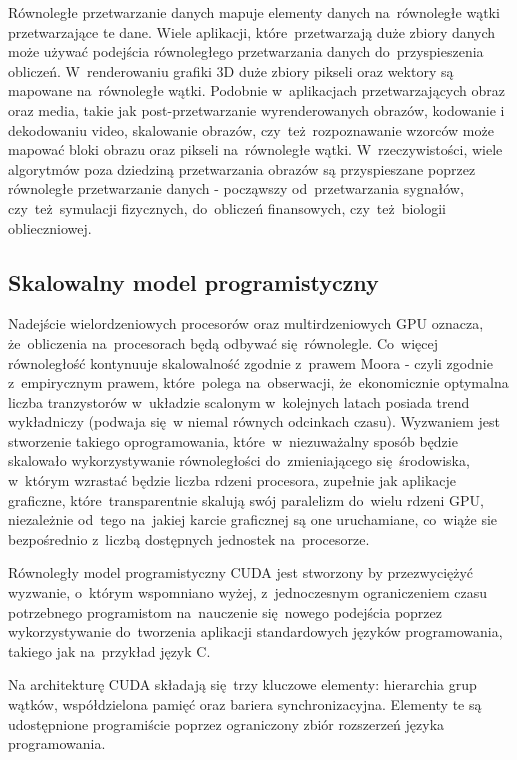 Równoległe przetwarzanie danych mapuje elementy danych na~równoległe wątki przetwarzające te dane. Wiele aplikacji, które~przetwarzają duże zbiory danych może używać podejścia równoległego przetwarzania danych do~przyspieszenia obliczeń. W~renderowaniu grafiki 3D duże zbiory pikseli oraz wektory są mapowane na~równoległe wątki. Podobnie w~aplikacjach przetwarzających obraz oraz media, takie jak post-przetwarzanie wyrenderowanych obrazów, kodowanie i~ dekodowaniu video, skalowanie obrazów, czy~też~rozpoznawanie wzorców może mapować bloki obrazu oraz pikseli na~równoległe wątki. W~rzeczywistości, wiele algorytmów poza dziedziną przetwarzania obrazów są przyspieszane poprzez równoległe przetwarzanie danych - począwszy od~przetwarzania sygnałów, czy~też~symulacji fizycznych, do~obliczeń finansowych, czy~też~biologii oblieczniowej.

\subsection{Skalowalny model programistyczny}
Nadejście wielordzeniowych procesorów oraz multirdzeniowych GPU oznacza, że~obliczenia na~procesorach będą odbywać się~równolegle. Co~więcej równoległość kontynuuje skalowalność zgodnie z~prawem Moora - czyli zgodnie z~empirycznym prawem, które~polega na~obserwacji, że~ekonomicznie optymalna liczba tranzystorów w~układzie scalonym w~kolejnych latach posiada trend wykładniczy (podwaja się~w niemal równych odcinkach czasu). Wyzwaniem jest stworzenie takiego oprogramowania, które~w~niezuważalny sposób będzie skalowało wykorzystywanie równoległości do~zmieniającego się~środowiska, w~którym wzrastać będzie liczba rdzeni procesora, zupełnie jak aplikacje graficzne, które~transparentnie skalują swój paralelizm do~wielu rdzeni GPU, niezależnie od~tego na~jakiej karcie graficznej są one uruchamiane, co~wiąże sie bezpośrednio z~liczbą dostępnych jednostek na~procesorze.

Równoległy model programistyczny CUDA jest stworzony by przezwyciężyć wyzwanie, o~którym wspomniano wyżej, z~jednoczesnym ograniczeniem czasu potrzebnego programistom na~nauczenie się~nowego podejścia poprzez wykorzystywanie do~tworzenia aplikacji standardowych języków programowania, takiego jak na~przykład język C.

Na architekturę CUDA składają się~trzy kluczowe elementy: hierarchia grup wątków, współdzielona pamięć oraz bariera synchronizacyjna. Elementy te są udostępnione programiście poprzez ograniczony zbiór rozszerzeń języka programowania.

